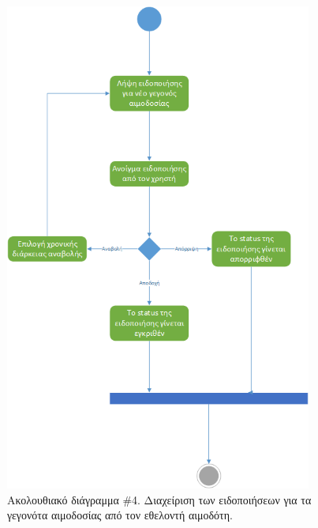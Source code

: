 	    \begin{figure}[H]
		    \centering
		    \includegraphics[width=0.9\textwidth]{ManageNotifications.png}
		    \caption{Ακολουθιακό διάγραμμα \#4. Διαχείριση των ειδοποιήσεων για τα γεγονότα αιμοδοσίας από τον εθελοντή αιμοδότη.}
		    \label{fig:manage}
		\end{figure}

